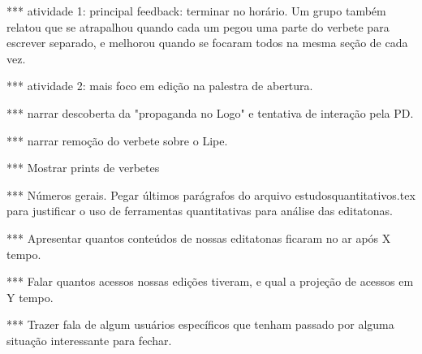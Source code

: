 *** atividade 1: principal feedback: terminar no horário. Um grupo também relatou que se atrapalhou quando cada um pegou uma parte do verbete para escrever separado, e melhorou quando se focaram todos na mesma seção de cada vez.

*** atividade 2: mais foco em edição na palestra de abertura.

*** narrar descoberta da "propaganda no Logo" e tentativa de interação pela PD.

*** narrar remoção do verbete sobre o Lipe.

*** Mostrar prints de verbetes

*** Números gerais. Pegar últimos parágrafos do arquivo estudosquantitativos.tex para justificar o uso de ferramentas quantitativas para análise das editatonas.

*** Apresentar quantos conteúdos de nossas editatonas ficaram no ar após X tempo.

*** Falar quantos acessos nossas edições tiveram, e qual a projeção de acessos em Y tempo.

*** Trazer fala de algum usuários específicos que tenham passado por alguma situação interessante para fechar.